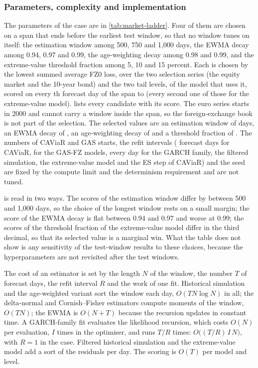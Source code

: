 \subsubsection{Parameters, complexity and implementation}
The parameters of the case are in \cref{tab:market-ladder}. Four of them are chosen on a span that ends before the earliest test
window, so that no window tunes on itself: the estimation window among 500, 750 and 1,000 days, the EWMA decay among 0.94, 0.97 and
0.99, the age-weighting decay among 0.98 and 0.99, and the extreme-value threshold fraction among 5, 10 and 15 percent. Each is chosen by
the lowest summed average FZ0 loss, over the two selection series (the equity market and the 10-year bond) and the two tail levels, of the model that
uses it, scored on every \mkSpanStride{}th forecast day of the span \mkSpanStart{} to \mkSpanEnd{} (every second one of those for the extreme-value model).  lists every candidate
with its score. The euro series starts in 2000 and cannot carry a window inside the span, so the foreign-exchange book is not part of the
selection. The selected values are an estimation window of \mkSelEstimationWindowDays{} days, an EWMA decay of \mkSelEwmaLambda{}, an
age-weighting decay of \mkSelAgeWeightLambda{} and a threshold fraction of \mkSelEvtThresholdFraction{}. The numbers of CAViaR and GAS starts, the
refit intervals (\mkCaviarRefit{} forecast days for CAViaR, \mkGasRefit{} for the GAS-FZ models, every day for the GARCH family, the filtered
simulation, the extreme-value model and the ES step of CAViaR) and the seed \mkSeed{} are fixed by the compute limit and the determinism
requirement and are not tuned.



 is read in two ways. The scores of the estimation window differ by \mkSelWinGap{} between 500 and 1,000 days, so the choice of
the longest window rests on a small margin; the score of the EWMA decay is flat between 0.94 and 0.97 and worse at 0.99; the scores of the threshold
fraction of the extreme-value model differ in the third decimal, so that its selected value is a marginal win. What the table does not show
is any sensitivity of the test-window results to these choices, because the hyperparameters are not revisited after the test windows.

The cost of an estimator is set by the length $N$ of the window, the number $T$ of forecast days, the refit interval $R$ and the work
of one fit. Historical simulation and the age-weighted variant sort the window each day, $O(TN\log N)$ in all; the delta-normal and
Cornish--Fisher estimators compute moments of the window, $O(TN)$; the EWMA is $O(N+T)$ because the recursion updates in constant time. A
GARCH-family fit evaluates the likelihood recursion, which costs $O(N)$ per evaluation, $I$ times in the optimiser, and runs $T/R$ times: $O\big((T/R)\,I\,N\big)$, with
$R=1$ in the case. Filtered historical simulation and the extreme-value model add a sort of the residuals per day. The scoring is $O(T)$ per model and level.

